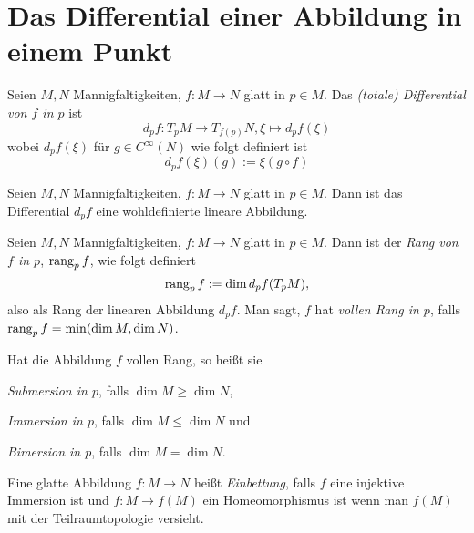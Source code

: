 \section{Das Differential einer Abbildung in einem Punkt}
\label{sec:differential}

\begin{definition}
  Seien $M,N$ Mannigfaltigkeiten, $f\colon M \to N$ glatt in $p\in
  M$. Das \emph{(totale) Differential von $f$ in $p$} ist
  \begin{equation*}
    d_pf \colon T_pM \to T_{f(p)}N, \xi \mapsto d_pf(\xi)
  \end{equation*}
  wobei $d_pf(\xi)$ für $g\in C^\infty(N)$ wie folgt definiert ist
  \begin{equation*}
    d_pf(\xi)(g) := \xi(g\circ f)
  \end{equation*}
\end{definition}

\begin{proposition}
  Seien $M,N$ Mannigfaltigkeiten, $f\colon M \to N$ glatt in $p\in
  M$. Dann ist das Differential $d_pf$ eine wohldefinierte lineare Abbildung.
\end{proposition}

\begin{definition}
  Seien $M,N$ Mannigfaltigkeiten, $f\colon M \to N$ glatt in $p\in
  M$. Dann ist der \emph{Rang von $f$ in $p$}, $\operatorname{rang}_p f$, wie folgt definiert
  \begin{equation*}
    \operatorname{rang}_p f := \dim d_pf(T_pM),
  \end{equation*}
  also als Rang der linearen Abbildung $d_pf$. Man sagt, $f$ hat
  \emph{vollen Rang in $p$}, falls $\operatorname{rang}_p f = \min(\dim M,\dim N)$.

  Hat die Abbildung $f$ vollen Rang, so heißt sie
  \begin{statements}
  \item \emph{Submersion in $p$}, falls  $\dim M \geq \dim N$,
  \item \emph{Immersion in $p$}, falls $\dim M \leq \dim N$ und
  \item \emph{Bimersion in $p$}, falls $\dim M = \dim N$.
  \end{statements}

  Eine glatte Abbildung $f\colon M \to N$ heißt \emph{Einbettung},
  falls $f$ eine injektive Immersion ist und $f\colon M \to f(M)$ ein
  Homeomorphismus ist wenn man $f(M)$ mit der Teilraumtopologie versieht.
\end{definition}

